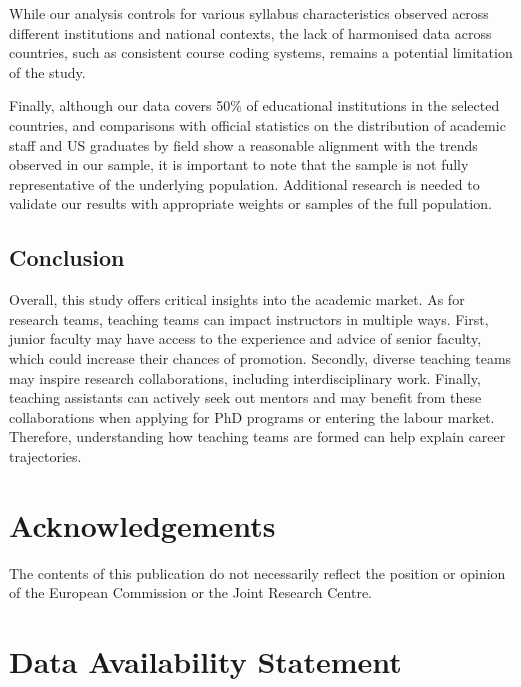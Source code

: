 \documentclass[
  british,
  12pt, %
]{article}
\begin{document}
While our analysis controls for various syllabus characteristics observed across different institutions and national contexts, the lack of harmonised data across countries, such as consistent course coding systems, remains a potential limitation of the study.

Finally, although our data covers 50\% of educational institutions in the selected countries, and comparisons with official statistics on the distribution of academic staff and US graduates by field show a reasonable alignment with the trends observed in our sample, it is important to note that the sample is not fully representative of the underlying population. Additional research is needed to validate our results with appropriate weights or samples of the full population.

\subsection{Conclusion}\label{conclusion}

Overall, this study offers critical insights into the academic market. As for research teams, teaching teams can impact instructors in multiple ways. First, junior faculty may have access to the experience and advice of senior faculty, which could increase their chances of promotion. Secondly, diverse teaching teams may inspire research collaborations, including interdisciplinary work. Finally, teaching assistants can actively seek out mentors and may benefit from these collaborations when applying for PhD programs or entering the labour market. Therefore, understanding how teaching teams are formed can help explain career trajectories.

\clearpage
\processdelayedfloats
\clearpage

\section*{Acknowledgements}\label{acknowledgements}

The contents of this publication do not necessarily reflect the position or opinion of the European Commission or the Joint Research Centre.

\section*{Data Availability Statement}\label{data-availability-statement}
\end{document}
